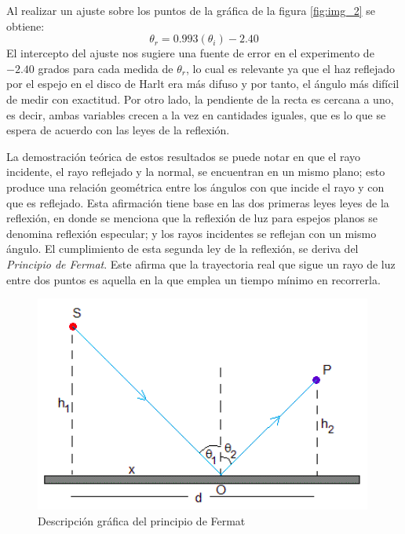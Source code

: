 \documentclass[
aps,
reprint,
amsmath, amssymb,
superscriptaddress,
]{revtex4-2}
\begin{document}
Al realizar un ajuste sobre los puntos de la gráfica de la figura \ref{fig:img_2} se obtiene:
\begin{equation}
    \theta_r = 0.993(\theta_i) - 2.40
\end{equation}
El intercepto del ajuste nos sugiere una fuente de error en el experimento de $-2.40$ grados para cada medida de $\theta_r$, lo cual es relevante ya que el haz reflejado por el espejo en el disco de Harlt era más difuso y por tanto, el ángulo más difícil de medir con exactitud. Por otro lado, la pendiente de la recta es cercana a uno, es decir, ambas variables crecen a la vez en cantidades iguales, que es lo que se espera de acuerdo con las leyes de la reflexión.

La demostración teórica de estos resultados se puede notar en que el rayo incidente, el rayo reflejado
y la normal, se encuentran en un mismo plano; esto produce una relación geométrica entre los ángulos con que incide el rayo y con que es reflejado. Esta afirmación tiene base en las dos primeras leyes leyes de la reflexión, en donde se menciona que la reflexión de luz para espejos planos se denomina reflexión especular; y los rayos incidentes se reflejan con un mismo ángulo. El cumplimiento de esta segunda ley de la reflexión, se deriva del \textit{Principio de Fermat}. Este afirma que la trayectoria real que sigue un rayo de luz entre dos puntos es aquella en la que emplea un tiempo mínimo en recorrerla.\\

\begin{figure}[H]
    \centering
    \includegraphics[width=\columnwidth]{img/PF.png}
    \caption{Descripción gráfica del principio de Fermat}
    \label{fig:k1}
\end{figure}
\end{document}
